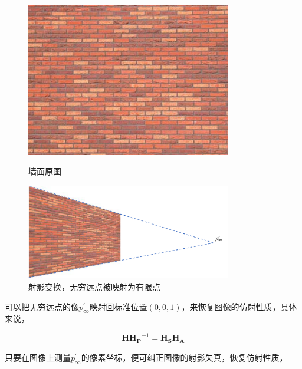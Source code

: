 \documentclass[hpyerref,UTF8,a4paper,titlepage,12pt,oneside]{ctexbook}
\theoremstyle{definition}
\begin{document}
		\begin{figure}[H]
			\begin{minipage}[t]{0.52\linewidth}
				\centering
				\includegraphics[width=0.8\textwidth]{images/origin_.jpeg}
				\caption{墙面原图}
			\end{minipage}
			\begin{minipage}[t]{0.78\linewidth}
				\centering
				\includegraphics[width=0.8\textwidth]{images/projective_.png}
				\caption{射影变换，无穷远点被映射为有限点}
			\end{minipage}			
		\end{figure}

		可以把无穷远点的像$p^{\prime}_{\infty}$映射回标准位置$(0,0,1)$，来恢复图像的仿射性质，具体来说，

		$$
			\mathbf{H}\mathbf{H_P}^{-1} = \mathbf{H_S}\mathbf{H_A}
		$$

		只要在图像上测量$p^{\prime}_{\infty}$的像素坐标，便可纠正图像的射影失真，恢复仿射性质，
\end{document}
